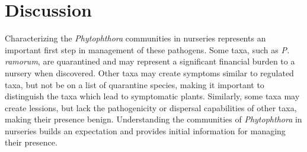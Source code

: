\documentclass[12pt]{article}
\begin{document}


\section*{\sffamily\normalsize{Discussion}}


Characterizing the \emph{Phytophthora} communities in nurseries represents an important first step in management of these pathogens.  Some taxa, such as \emph{P. ramorum}, are quarantined and may represent a significant financial burden to a nursery when discovered.  Other taxa may create symptoms similar to regulated taxa, but not be on a list of quarantine species, making it important to distinguish the taxa which lead to symptomatic plants.  Similarly, some taxa may create lessions, but lack the pathogenicity or dispersal capabilities of other taxa, making their presence benign.  Understanding the communities of \emph{Phytophthora} in nurseries builds an expectation and provides initial information for managing their presence.
\end{document}
